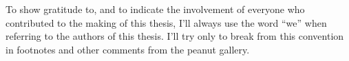 \begin{acknowledgements}
  To show gratitude to, and to indicate the involvement of everyone who contributed to the
  making of this thesis, I'll always use the word ``we'' when referring to the authors of 
  this thesis. I'll try only to break from this convention in footnotes and other comments
  from the peanut gallery.  

\end{acknowledgements}



